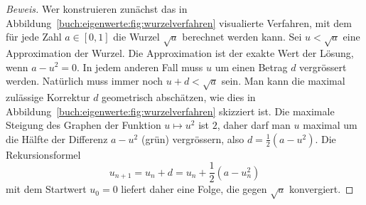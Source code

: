 \begin{proof}[Beweis]
Wer konstruieren zunächst das in
Abbildung~\ref{buch:eigenwerte:fig:wurzelverfahren}
visualierte Verfahren, mit dem für jede Zahl $a\in[0,1]$
die Wurzel $\sqrt{a}$ berechnet werden kann.
Sei $u < \sqrt{a}$ eine Approximation der Wurzel.
Die Approximation ist der exakte Wert der Lösung, wenn $a-u^2=0$.
In jedem anderen Fall muss $u$ um einen Betrag $d$ vergrössert werden.
Natürlich muss immer noch $u+d<\sqrt{a}$ sein.
Man kann die maximal zulässige Korrektur $d$ geometrisch abschätzen,
wie dies in Abbildung~\ref{buch:eigenwerte:fig:wurzelverfahren}
skizziert ist.
Die maximale Steigung des Graphen der Funktion $u\mapsto u^2$ ist $2$,
daher darf man $u$ maximal um die Hälfte der Differenz $a-u^2$ (grün)
vergrössern, also $d=\frac12(a-u^2)$.
Die Rekursionsformel
\[
u_{n+1} = u_n + d = u_n + \frac12(a-u_n^2)
\]
mit dem Startwert $u_0=0$ liefert daher eine 
Folge, die gegen $\sqrt{a}$ konvergiert.
\end{proof}

